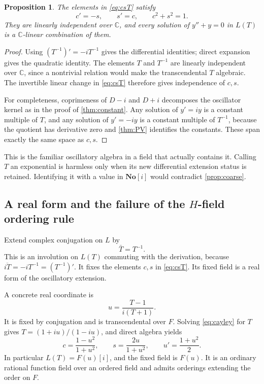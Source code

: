 \documentclass[11pt,letterpaper]{article}
\numberwithin{equation}{section}
\newtheorem{proposition}[proposition]{Proposition}
\theoremstyle{definition}
\theoremstyle{remark}
\newcommand{\No}{\mathbf{No}}
\newcommand{\C}{\mathbb C}
\begin{document}
\begin{proposition}\label{prop:oscillatorExtension}
The elements in \eqref{eq:csT} satisfy
\[
 c'=-s,\qquad s'=c,\qquad c^2+s^2=1.
\]
They are linearly independent over $\C$, and every solution of $y''+y=0$ in $L(T)$ is a $\C$-linear combination of them.
\end{proposition}
\begin{proof}
Using $(T^{-1})'=-iT^{-1}$ gives the differential identities; direct expansion gives the quadratic identity. The elements $T$ and $T^{-1}$ are linearly independent over $\C$, since a nontrivial relation would make the transcendental $T$ algebraic. The invertible linear change in \eqref{eq:csT} therefore gives independence of $c,s$.

For completeness, coprimeness of $D-i$ and $D+i$ decomposes the oscillator kernel as in the proof of \cref{thm:constant}. Any solution of $y'=iy$ is a constant multiple of $T$, and any solution of $y'=-iy$ is a constant multiple of $T^{-1}$, because the quotient has derivative zero and \cref{thm:PV} identifies the constants. These span exactly the same space as $c,s$.
\end{proof}

This is the familiar oscillatory algebra in a field that actually contains it. Calling $T$ an exponential is harmless only when its new differential extension status is retained. Identifying it with a value in $\No[i]$ would contradict \cref{prop:coarse}.

\subsection{A real form and the failure of the \texorpdfstring{$H$}{H}-field ordering rule}
Extend complex conjugation on $L$ by
\[
 \bar T=T^{-1}.
\]
This is an involution on $L(T)$ commuting with the derivation, because $\overline{iT}=-iT^{-1}=(T^{-1})'$. It fixes the elements $c,s$ in \eqref{eq:csT}. Its fixed field is a real form of the oscillatory extension.

A concrete real coordinate is
\begin{equation}\label{eq:cayley}
 u=\frac{T-1}{i(T+1)}.
\end{equation}
It is fixed by conjugation and is transcendental over $F$. Solving \eqref{eq:cayley} for $T$ gives $T=(1+iu)/(1-iu)$, and direct algebra yields
\begin{equation}\label{eq:cayleycs}
 c=\frac{1-u^2}{1+u^2},\qquad
 s=\frac{2u}{1+u^2},\qquad
 u'=\frac{1+u^2}{2}.
\end{equation}
In particular $L(T)=F(u)[i]$, and the fixed field is $F(u)$. It is an ordinary rational function field over an ordered field and admits orderings extending the order on $F$.
\end{document}
